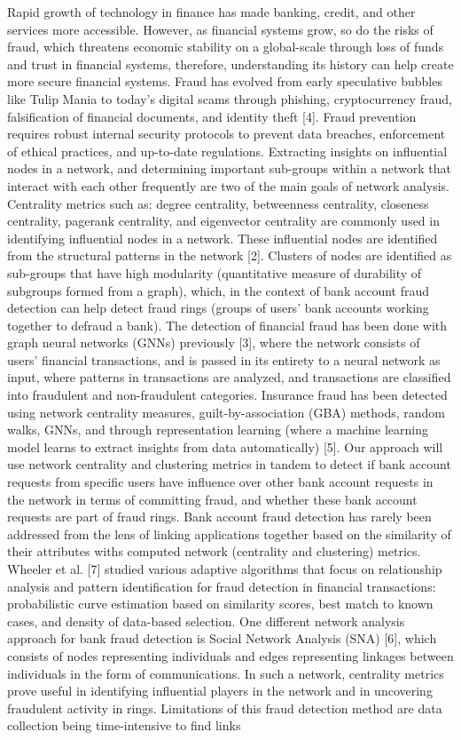 \documentclass{styles/svproc}
\begin{document}
Rapid growth of technology in finance has made banking, credit, and other services more accessible. However, as financial systems grow, so do the risks of fraud, which threatens economic stability on a global-scale through loss of funds and trust in financial systems, therefore, understanding its history can help create more secure financial systems. Fraud has evolved from early speculative bubbles like Tulip Mania to today’s digital scams through phishing, cryptocurrency fraud, falsification of financial documents, and identity theft [4]. Fraud prevention requires robust internal security protocols to prevent data breaches, enforcement of ethical practices, and up-to-date regulations. Extracting insights on influential nodes in a network, and determining important sub-groups within a network that interact with each other frequently are two of the main goals of network analysis. Centrality metrics such as: degree centrality, betweenness centrality, closeness centrality, pagerank centrality, and eigenvector centrality are commonly used in identifying influential nodes in a network. These influential nodes are identified from the structural patterns in the network [2]. Clusters of nodes are identified as sub-groups that have high modularity (quantitative measure of durability of subgroups formed from a graph), which, in the context of bank account fraud detection can help detect fraud rings (groups of users' bank accounts working together to defraud a bank). The detection of financial fraud has been done with graph neural networks (GNNs) previously [3], where the network consists of users’ financial transactions, and is passed in its entirety to a neural network as input, where patterns in transactions are analyzed, and transactions are classified into fraudulent and non-fraudulent categories. Insurance fraud has been detected using network centrality measures, guilt-by-association (GBA) methods, random walks, GNNs, and through representation learning (where a machine learning model learns to extract insights from data automatically) [5]. Our approach will use network centrality and clustering metrics in tandem to detect if bank account requests from specific users have influence over other bank account requests in the network in terms of committing fraud, and whether these bank account requests are part of fraud rings. Bank account fraud detection has rarely been addressed from the lens of linking applications together based on the similarity of their attributes withs computed network (centrality and clustering) metrics. Wheeler et al. [7] studied various adaptive algorithms that focus on relationship analysis and pattern identification for fraud detection in financial transactions: probabilistic curve estimation based on similarity scores, best match to known cases, and density of data-based selection. One different network analysis approach for bank fraud detection is Social Network Analysis (SNA) [6], which consists of nodes representing individuals and edges representing linkages between individuals in the form of communications. In such a network, centrality metrics prove useful in identifying influential players in the network and in uncovering fraudulent activity in rings. Limitations of this fraud detection method are data collection being time-intensive to find links 
\end{document}
